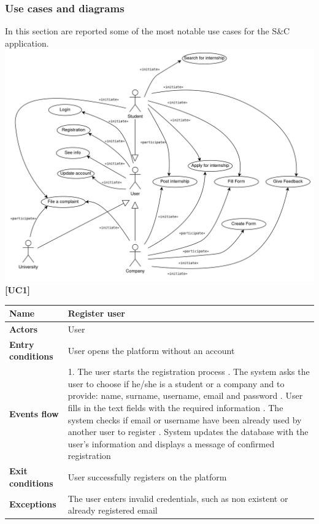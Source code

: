 \documentclass[11pt,twoside]{article}
\begin{document}
		\subsubsection{Use cases and diagrams}
In this section are reported some of the most notable use cases for the S\&C application. \\
\includegraphics[width=\textwidth]{Images/Use_case_diagram}
\newpage
\large{\textbf{[UC1]}}
\begin{table}[H]
\begin{tabular}{| p{} | p{} |}
\hline
\textbf{Name}
& Register user \\
\hline
\textbf{Actors}
& User \\
\hline
\textbf{Entry conditions}
& User opens the platform without an account \\
\hline
\textbf{Events flow}
& 1. The user starts the registration process \newline
2. The system asks the user to choose if he/she is a student or a company and to provide: name, surname, username, email and password \newline
3. User fills in the text fields with the required information \newline
4. The system checks if email or username have been already used by another user to register \newline
5. System updates the database with the user’s information and 
displays a message of confirmed registration  \\
\hline
\textbf{Exit conditions}
& User successfully registers on the platform \\
\hline
\textbf{Exceptions}
& The user enters invalid credentials, such as non existent or already registered email \\
\hline
\end{tabular}
\end{table}
\end{document}
